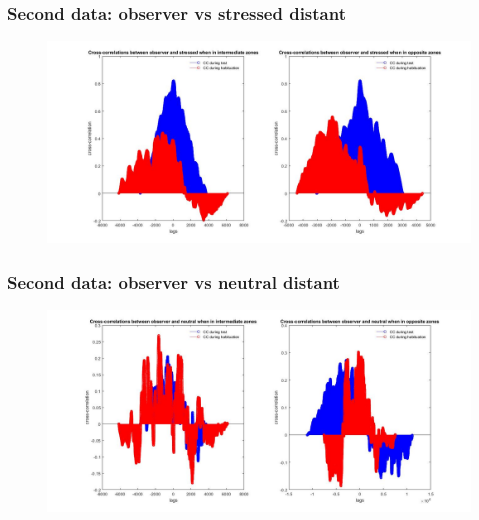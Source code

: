 \documentclass{beamer}
\begin{document}
\begin{frame}
\frametitle{Second data: observer vs stressed distant }





\begin{figure}[H]
\begin{center}
\hspace*{-1cm}
\includegraphics[scale=.30]{obs_stress_distant2.jpg} 
\end{center}  


\end{figure}


\end{frame}	


\begin{frame}
\frametitle{Second data:  observer vs neutral distant}





\begin{figure}[H]
\begin{center}
\hspace*{-1cm}
\includegraphics[scale=.30]{obs_neut_distant2.jpg} 
\end{center}  


\end{figure}


\end{frame}	
\end{document}

